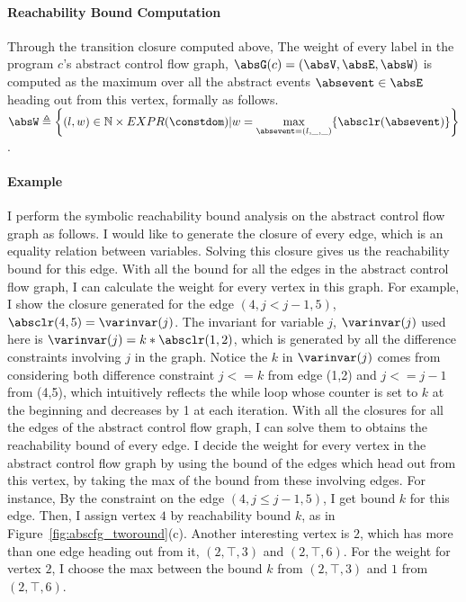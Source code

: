\paragraph*{Reachability Bound Computation}
Through the transition closure computed above, 
The weight of every label in 
the program $c$'s abstract control flow graph,
$\absG(c) =(\absV, \absE, \absW)$
is 
computed as the maximum over all the abstract events $\absevent \in \absE$ heading out from this vertex, formally as follows.
\\
$\absW 
\triangleq \left\{ (l, w) \in \mathbb{N} \times EXPR(\constdom) | w = \max\limits_{\absevent = (l, \_, \_)} \{ \absclr(\absevent)\} \right\}$.
\paragraph*{Example}
 I perform the symbolic reachability bound analysis on the abstract control flow graph as follows. 
 I would like to generate the closure of every edge, which is an equality relation between variables.  Solving this closure gives us the reachability bound for this edge. With all the bound for all the edges in the abstract control flow graph, I can calculate the weight for every vertex in this graph. For example, I show the closure generated for the edge 
$(4, j < j - 1, 5)$, 
$\absclr(4, 5) = \varinvar(j)$. The invariant for variable $j$, $\varinvar(j)$ used here is 
$\varinvar(j) = k * \absclr(1, 2)$, which is generated by all the difference constraints involving $j$ in the graph. Notice the $k$ in $\varinvar(j)$ comes from considering both difference constraint $j<=k$ from edge (1,2) and $j<=j-1$ from (4,5), which intuitively reflects the while loop whose counter is set to $k$ at the beginning and decreases by 1 at each iteration. 
With all the closures for all the edges of the abstract control flow graph, I can solve them to obtains the reachability bound of every edge.  I decide the weight for every vertex in the abstract control flow graph by using the bound of the edges which head out from this vertex, by taking the max of the bound from these involving edges. For instance,   
By the constraint on the edge $(4, j \leq j - 1, 5)$, I get bound $k$ for this edge.
Then, I assign vertex $4$ by reachability bound $k$, as in Figure~\ref{fig:abscfg_tworound}(c). 
Another interesting vertex is $2$, which has more than one edge heading out from it, $(2, \top, 3)$ and $(2,\top, 6)$. For the weight for vertex $2$, I choose the max between the bound $k$ from $(2,\top, 3)$ and $1$ from $(2,\top, 6)$.
